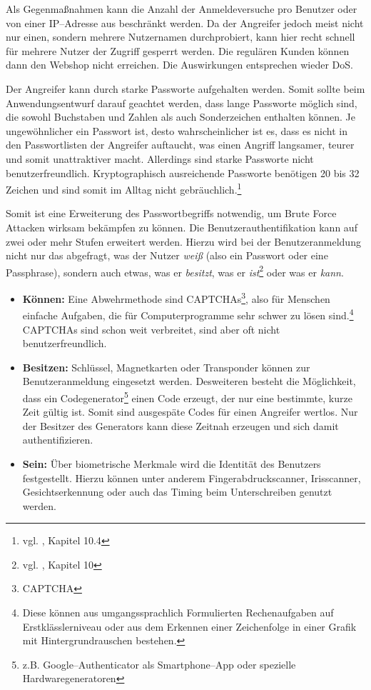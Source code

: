 Als Gegenmaßnahmen kann die Anzahl der Anmeldeversuche pro Benutzer oder von einer IP--Adresse aus beschränkt werden. Da der Angreifer jedoch meist nicht nur einen, sondern mehrere Nutzernamen durchprobiert, kann hier recht schnell für mehrere Nutzer der Zugriff gesperrt werden. Die regulären Kunden können dann den Webshop nicht erreichen. Die Auswirkungen entsprechen wieder \ac{DoS}.

Der Angreifer kann durch starke Passworte aufgehalten werden. Somit sollte beim Anwendungsentwurf darauf geachtet werden, dass lange Passworte möglich sind, die sowohl Buchstaben und Zahlen als auch Sonderzeichen enthalten können. Je ungewöhnlicher ein Passwort ist, desto wahrscheinlicher ist es, dass es nicht in den Passwortlisten der Angreifer auftaucht, was einen Angriff langsamer, teurer und somit unattraktiver macht. Allerdings sind starke Passworte nicht benutzerfreundlich. Kryptographisch ausreichende Passworte benötigen 20 bis 32 Zeichen und sind somit im Alltag nicht gebräuchlich.\footnote{vgl. \cite{kaufman}, Kapitel 10.4}

Somit ist eine Erweiterung des Passwortbegriffs notwendig, um Brute Force Attacken wirksam bekämpfen zu können. Die Benutzerauthentifikation kann auf zwei oder mehr Stufen erweitert werden. Hierzu wird bei der Benutzeranmeldung nicht nur das abgefragt, was der Nutzer \textit{weiß} (also ein Passwort oder eine Passphrase), sondern auch etwas, was er \textit{besitzt}, was er \textit{ist}\footnote{vgl. \cite{kaufman}, Kapitel 10} oder was er \textit{kann}.

\begin{itemize}
	
\item \textbf{Können:} Eine Abwehrmethode sind \acs{CAPTCHA}s\footnote{\ac{CAPTCHA}}, also für Menschen einfache Aufgaben, die für Computerprogramme sehr schwer zu lösen sind.\footnote{Diese können aus umgangssprachlich Formulierten Rechenaufgaben auf Erstklässlerniveau oder aus dem Erkennen einer Zeichenfolge in einer Grafik mit Hintergrundrauschen bestehen.} \ac{CAPTCHA}s sind schon weit verbreitet, sind aber oft nicht benutzerfreundlich.
\item \textbf{Besitzen:} Schlüssel, Magnetkarten oder Transponder können zur Benutzeranmeldung eingesetzt werden. Desweiteren besteht die Möglichkeit, dass ein Codegenerator\footnote{z.B. Google--Authenticator als Smartphone--App oder spezielle Hardwaregeneratoren} einen Code erzeugt, der nur eine bestimmte, kurze Zeit gültig ist. Somit sind ausgespäte Codes für einen Angreifer wertlos. Nur der Besitzer des Generators kann diese Zeitnah erzeugen und sich damit authentifizieren. 
\item \textbf{Sein:} Über biometrische Merkmale wird die Identität des Benutzers festgestellt. Hierzu können unter anderem Fingerabdruckscanner, Irisscanner, Gesichtserkennung oder auch das Timing beim Unterschreiben genutzt werden.

\end{itemize}


